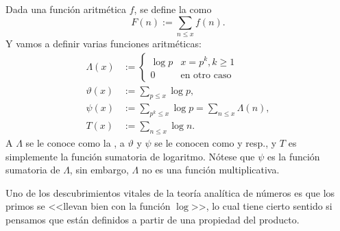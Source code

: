 \documentclass[teoria-numeros.tex]{subfiles}
\begin{document}
\begin{mydef}
	Dada una función aritmética $f$, se define la  como
	$$ F(n) := \sum_{n\le x} f(n). $$
	Y vamos a definir varias funciones aritméticas:
	\begin{align*}
		\Lambda(x) &:=
		\begin{cases}
			\log p &x = p^k, k\ge 1 \\
			0 &\text{en otro caso}
		\end{cases} \\
		\vartheta(x) &:= \sum_{p \le x} \log p, \\
		\psi(x) &:= \sum_{p^k \le x} \log p = \sum_{n \le x} \Lambda(n), \\
		T(x) &:= \sum_{n \le x} \log n.
	\end{align*}
	A $\Lambda$ se le conoce como la ,
	a $\vartheta$ y $\psi$ se le conocen como  y  resp.,
	y $T$ es simplemente la función sumatoria de logaritmo.
	Nótese que $\psi$ es la función sumatoria de $\Lambda$, sin embargo, $\Lambda$ no es una función multiplicativa.
\end{mydef}
Uno de los descubrimientos vitales de la teoría analítica de números es que los primos se <<llevan bien con la función $\log$>>,
lo cual tiene cierto sentido si pensamos que están definidos a partir de una propiedad del producto.
\end{document}
